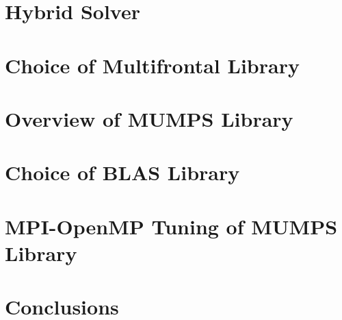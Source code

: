 





















\section{Hybrid Solver}
\label{subseq:choice and motivation}




\section{Choice of Multifrontal Library}
\label{subseq:multifrontal method}



\section{Overview of MUMPS Library}
\label{subseq:multifrontal method}


\section{Choice of BLAS Library}
\label{subseq:blas-comparison}



\section{MPI-OpenMP Tuning of MUMPS Library}
\label{subseq:mpi-openmp}


\section{Conclusions}
\label{subseq:conclusions}




